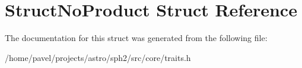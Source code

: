 \hypertarget{structStructNoProduct}{}\section{Struct\+No\+Product Struct Reference}
\label{structStructNoProduct}


The documentation for this struct was generated from the following file\+:\begin{DoxyCompactItemize}
\item 
/home/pavel/projects/astro/sph2/src/core/traits.\+h\end{DoxyCompactItemize}
